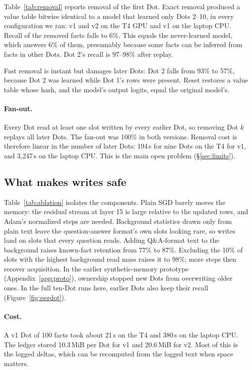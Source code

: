 \documentclass[11pt]{article}
\begin{document}
Table~\ref{tab:removal} reports removal of the first Dot. Exact removal produced a value table bitwise identical to a model that learned only Dots 2--10, in every configuration we ran: v1 and v2 on the T4 GPU and v1 on the laptop CPU. Recall of the removed facts falls to 6\%. This equals the never-learned model, which answers 6\% of them, presumably because some facts can be inferred from facts in other Dots. Dot 2's recall is 97--98\% after replay.

Fast removal is instant but damages later Dots: Dot 2 falls from 93\% to 57\%, because Dot 2 was learned while Dot 1's rows were present. Reset restores a value table whose hash, and the model's output logits, equal the original model's.

\paragraph{Fan-out.} Every Dot read at least one slot written by every earlier Dot, so removing Dot $k$ replays all later Dots. The fan-out was 100\% in both versions. Removal cost is therefore linear in the number of later Dots: 194\,s for nine Dots on the T4 for v1, and 3{,}247\,s on the laptop CPU. This is the main open problem (\S\ref{sec:limits}).

\subsection{What makes writes safe}


Table~\ref{tab:ablation} isolates the components. Plain SGD barely moves the memory: the residual stream at layer 15 is large relative to the updated rows, and Adam's normalized steps are needed. Background statistics drawn only from plain text leave the question-answer format's own slots looking rare, so writes land on slots that every question reads. Adding Q\&A-format text to the background raises known-fact retention from 77\% to 87\%. Excluding the 10\% of slots with the highest background read mass raises it to 98\%; more steps then recover acquisition. In the earlier synthetic-memory prototype (Appendix~\ref{app:proto}), ownership stopped new Dots from overwriting older ones. In the full ten-Dot runs here, earlier Dots also keep their recall (Figure~\ref{fig:perdot}).

\paragraph{Cost.} A v1 Dot of 100 facts took about 21\,s on the T4 and 380\,s on the laptop CPU. The ledger stored 10.3\,MiB per Dot for v1 and 20.6\,MiB for v2. Most of this is the logged deltas, which can be recomputed from the logged text when space matters.
\end{document}
